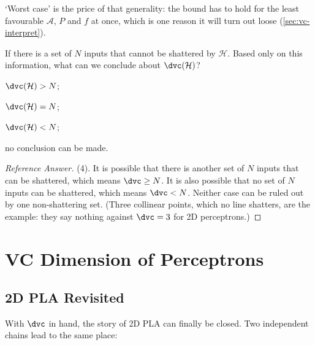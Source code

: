 `Worst case' is the price of that generality: the bound has to hold for the
least favourable \(\mathcal{A}\), \(P\) and \(f\) at once, which is one reason
it will turn out loose (\autoref{sec:vc-interpret}).

\begin{exercise}
    If there is a set of \(N\) inputs that cannot be shattered by
    \(\mathcal{H}\). Based only on this information, what can we conclude
    about \(\dvc(\mathcal{H})\)?
    \begin{enumerate*}[(1)]
        \item \(\dvc(\mathcal{H}) > N\); \item \(\dvc(\mathcal{H}) = N\);
        \item \(\dvc(\mathcal{H}) < N\); \item no conclusion can be made.
    \end{enumerate*}
\end{exercise}

\begin{proof}[Reference Answer]
    (4). It is possible that there is another set of \(N\) inputs that can be
    shattered, which means \(\dvc \ge N\). It is also possible that no set of
    \(N\) inputs can be shattered, which means \(\dvc < N\). Neither case can
    be ruled out by one non-shattering set. (Three collinear points, which
    no line shatters, are the example: they say nothing against
    \(\dvc = 3\) for 2D perceptrons.)
\end{proof}

\section{VC Dimension of Perceptrons}\label{sec:vc-perceptron}


\subsection{2D PLA Revisited}

With \(\dvc\) in hand, the story of 2D PLA can finally be closed. Two
independent chains lead to the same place:

